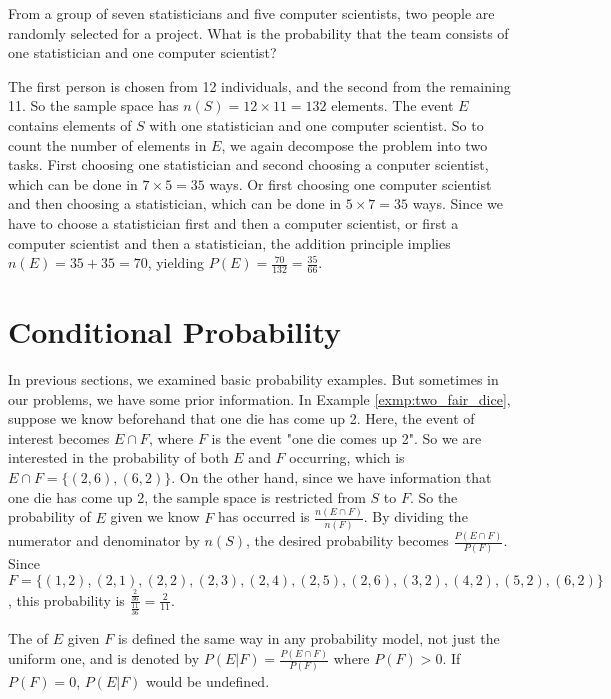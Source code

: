 \begin{exmp}
	From a group of seven statisticians and five computer scientists, two people are randomly selected for a project.
	What is the probability that the team consists of one statistician and one computer scientist?
\end{exmp}
\begin{solution}
	The first person is chosen from 12 individuals, and the second from the remaining 11.
	So the sample space has \( n(S) = 12 \times 11 = 132 \) elements.
	The event \( E \) contains elements of \( S \) with one statistician and one computer scientist.
	So to count the number of elements in \( E \), we again decompose the problem into two tasks.
	First choosing one statistician and second choosing a conputer scientist,
	which can be done in \( 7 \times 5 = 35 \) ways.
	Or first choosing one computer scientist and then choosing a statistician,
	which can be done in \( 5 \times 7 = 35 \) ways.
	Since we have to choose a statistician first and then a computer scientist, or first a computer scientist and then a statistician,
	the addition principle implies \( n(E) = 35 + 35 = 70 \), yielding \( P(E) = \frac{70}{132} = \frac{35}{66} \).
\end{solution}

\section{Conditional Probability}

In previous sections, we examined basic probability examples.
But sometimes in our problems, we have some prior information.
In Example \autoref{exmp:two_fair_dice}, suppose we know beforehand that one die has come up 2.
Here, the event of interest becomes \( E \cap F \), where \( F \) is the event "one die comes up 2".
So we are interested in the probability of both \( E \) and \( F \) occurring, which is \( E \cap F = \{ (2, 6), (6, 2) \} \).
On the other hand, since we have information that one die has come up 2, the sample space is restricted from \( S \) to \( F \).
So the probability of \( E \) given we know \( F \) has occurred is \( \frac{n(E \cap F)}{n(F)} \).
By dividing the numerator and denominator by \( n(S) \), the desired probability becomes \( \frac{P(E \cap F)}{P(F)} \).
Since \( F = \{ (1, 2), (2, 1), (2, 2), (2, 3), (2, 4), (2, 5), (2, 6), (3, 2), (4, 2), (5, 2), (6, 2) \} \),
this probability is \( \frac{\frac{2}{36}}{\frac{11}{36}} = \frac{2}{11} \).

The  of \( E \) given \( F \) is defined the same way in any probability model, not just the uniform one, and is denoted by \( P(E | F) = \frac{P(E \cap F)}{P(F)} \)
where \( P(F) > 0 \).
If \( P(F) = 0 \), \( P(E | F) \) would be undefined.

